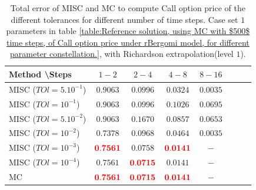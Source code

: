 \documentclass[11pt]{article}
\begin{document}
\begin{table}[!h]
	\centering
	\begin{tabular}{l*{6}{c}r}
		Method \textbackslash  Steps            & $1-2$ & $2-4$ & $4-8$ & $8-16$  \\
		\hline
		MISC ($TOl=5.10^{-1}$)  & $\mathbf{0.9063
		}$ & $\mathbf{ 0.0996}$ & $\mathbf{0.0324
		}$ & $\mathbf{ 0.0035}$ \\
		MISC ($TOl=10^{-1}$)  & $\mathbf{0.9063
		}$ & $\mathbf{ 0.0996}$ & $\mathbf{  0.1026}$ & $\mathbf{ 0.0695
		}$  \\
		MISC ($TOl=5.10^{-2}$)  & $\mathbf{0.9063
		}$ & $\mathbf{    0.1670}$ & $\mathbf{ 0.0857}$ & $\mathbf{0.0653
		}$  \\
		MISC ($TOl=10^{-2}$)  & $\mathbf{0.7378}$ & $\mathbf{  0.0968}$ & $\mathbf{   0.0464}$ & $\mathbf{ 0.0035}$  \\	
		MISC ($TOl=10^{-3}$)  & $\mathbf{{\color{red}0.7561}}$ & $\mathbf{0.0758}$ & $\mathbf{{\color{red}0.0141}}$ & $\mathbf{-}$  \\
		MISC ($TOl=10^{-4}$)  & $\mathbf{0.7561}$ & $\mathbf{{\color{red}0.0715}}$ & $\mathbf{0.0141}$ & $\mathbf{-}$  \\
		\hline
			MC   & $\mathbf{{\color{red}0.7561}}$  & $\mathbf{{\color{red}0.0715}}$  & $\mathbf{{\color{red}0.0141}}$ &$\mathbf{-}$   \\
		\hline
	\end{tabular}
	\caption{Total  error of MISC and MC to compute Call option price of the different tolerances for different number of time steps. Case set $1$ parameters in table \ref{table:Reference solution, using MC with $500$ time steps, of Call option price under rBergomi model, for different parameter constellation.}, with Richardson extrapolation(level $1$).}
	\label{Total  error of MISC and MC to compute Call option price of the different tolerances for different number of time steps. Case set $1$ parameters, with Richardson extrapolation(level $1$). The numbers between parentheses are the corresponding absolute errors.}
\end{table}
\end{document}
